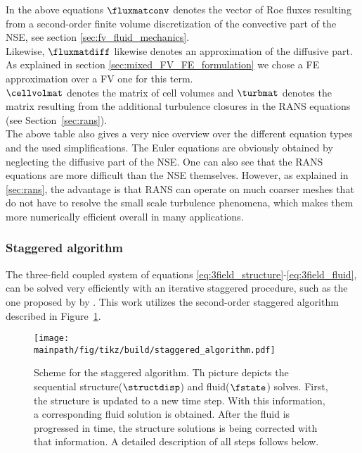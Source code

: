 \documentclass[../main.tex]{subfiles}
\begin{document}
In the above equations $\fluxmatconv$ denotes the vector of Roe fluxes resulting from a second-order finite volume discretization of the convective part of the \ac{NSE}, see section \ref{sec:fv_fluid_mechanics}.\\
Likewise, $\fluxmatdiff$ likewise denotes an approximation of the diffusive part. As explained in section \ref{sec:mixed_FV_FE_formulation} we chose a \ac{FE} approximation over a \ac{FV} one for this term.\\
$\cellvolmat$ denotes the matrix of cell volumes and $\turbmat$ denotes the matrix resulting from the additional turbulence closures in the \ac{RANS} equations (see Section~\ref{sec:rans}).\\
The above table also gives a very nice overview over the different equation types and the used simplifications. The Euler equations are obviously obtained by neglecting the diffusive part of the \ac{NSE}. One can also see that the \ac{RANS} equations are more difficult than the \ac{NSE} themselves. However, as explained in \ref{sec:rans}, the advantage is that \ac{RANS} can operate on much coarser meshes that do not have to resolve the small scale turbulence phenomena, which makes them more numerically efficient overall in many applications.
\\
\subsubsection{Staggered algorithm}\label{sec:staggered_algorithm}
The three-field coupled system of equations \eqref{eq:3field_structure}-\eqref{eq:3field_fluid}, can be solved very efficiently with an iterative staggered procedure, such as the one proposed by by \cite{Farhat1995}. This work utilizes the second-order staggered algorithm described in Figure~\ref{fig:staggered_algorithm}.


\begin{figure}[h!]
	\begin{center}
        \texttt{[image: \\mainpath/fig/tikz/build/staggered\_algorithm.pdf]}
        \caption[Staggered algorithm scheme]{Scheme for the staggered algorithm. Th picture depicts the sequential structure($\structdisp$) and fluid($\fstate$) solves. First, the structure is updated to a new time step. With this information, a corresponding fluid solution is obtained. After the fluid is progressed in time, the structure solutions is being corrected with that information. A detailed description of all steps follows below.}
		\label{fig:staggered_algorithm}
    \end{center}
\end{figure}
\end{document}
